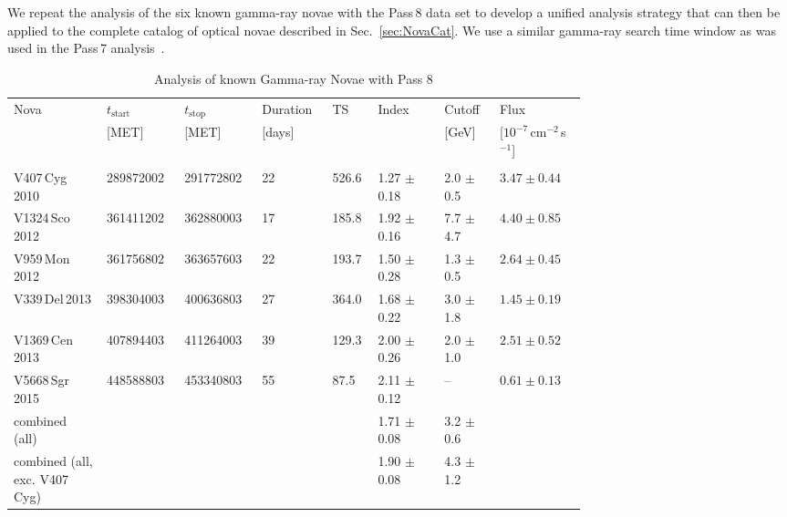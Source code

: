 \documentclass{aa} %
\begin{document}
We repeat the analysis of the six known gamma-ray novae with the Pass\,8 data set to develop a unified analysis strategy that can then be applied to the complete catalog of optical novae described in Sec.~\ref{sec:NovaCat}.
We use a similar gamma-ray search time window as was used in the Pass\,7 analysis~\citep{2014Sci...345..554A,2016ApJ...826..142C}. 

\begin{table*}
\caption{Analysis of known Gamma-ray Novae with Pass 8}
\label{tab:knownNovae}
\centering          
\begin{tabular}{L{0.14\linewidth} p{0.08\linewidth} p{0.08\linewidth} p{0.08\linewidth} p{0.04\linewidth} p{0.1\linewidth} p{0.08\linewidth} p{0.13\linewidth}}
\hline\hline 
Nova & $t_{\textrm{start}}$ &  $t_{\textrm{stop}}$ & Duration & TS & Index & Cutoff  & Flux \\
         &        [MET]               & [MET]                      & [days]     &      &  & [GeV]  & [$10^{-7}$\,cm$^{-2}\,$s$^{-1}$] \\
\hline\\
V407\,Cyg\,2010                        & 289872002 & 291772802 & 22 & 526.6 &	1.27 $\pm$ 0.18 &	2.0 $\pm$ 0.5    & $3.47\pm0.44$ \\
V1324\,Sco\,2012                      & 361411202 & 362880003 & 17 & 185.8 &	1.92 $\pm$ 0.16 &	7.7 $\pm$ 4.7    & $4.40\pm0.85$\\
V959\,Mon\,2012                       & 361756802 & 363657603 & 22 & 193.7 &	1.50 $\pm$ 0.28 &	1.3 $\pm$ 0.5    & $2.64\pm0.45$\\
V339\,Del\,2013                         & 398304003 & 400636803 & 27 & 364.0 &	1.68 $\pm$ 0.22 &	3.0 $\pm$ 1.8    & $1.45\pm0.19$\\
V1369\,Cen\,2013                      & 407894403 & 411264003 & 39 & 129.3 &      2.00 $\pm$ 0.26 &	2.0 $\pm$ 1.0    & $2.51\pm0.52$\\
V5668\,Sgr\,2015                       & 448588803 & 453340803 & 55 & 87.5   &      2.11 $\pm$ 0.12 &    --   & $0.61\pm0.13$\\  
\hline
combined (all)                            &                    &                    &      &      &       1.71 $\pm$ 0.08 &    3.2 $\pm$ 0.6    & \\
combined (all, exc. V407\,Cyg)  &                    &                    &       &     &       1.90 $\pm$ 0.08   &    4.3 $\pm$ 1.2    & \\
\hline                  
\end{tabular}
\end{table*}
\end{document}
